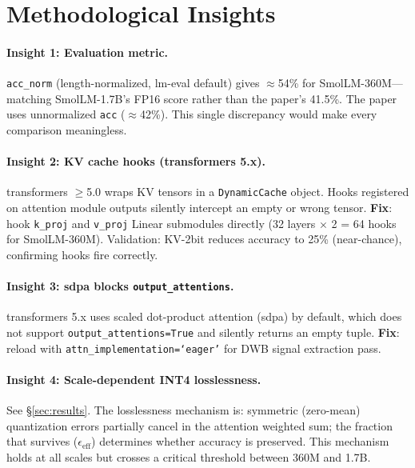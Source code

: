 \documentclass[10pt,twocolumn]{article}
\begin{document}
\section{Methodological Insights}
\label{sec:insights}

\paragraph{Insight 1: Evaluation metric.}
\texttt{acc\_norm} (length-normalized, lm-eval default) gives $\approx$54\%
for SmolLM-360M—matching SmolLM-1.7B's FP16 score rather than the
paper's 41.5\%.
The paper uses unnormalized \texttt{acc} ($\approx$42\%).
This single discrepancy would make every comparison meaningless.

\paragraph{Insight 2: KV cache hooks (transformers 5.x).}
transformers $\geq$5.0 wraps KV tensors in a \texttt{DynamicCache} object.
Hooks registered on attention module outputs silently intercept an empty
or wrong tensor.
\textbf{Fix}: hook \texttt{k\_proj} and \texttt{v\_proj} Linear submodules
directly (32 layers $\times$ 2 = 64 hooks for SmolLM-360M).
Validation: KV-2bit reduces accuracy to 25\% (near-chance), confirming
hooks fire correctly.

\paragraph{Insight 3: sdpa blocks \texttt{output\_attentions}.}
transformers 5.x uses scaled dot-product attention (sdpa) by default,
which does not support \texttt{output\_attentions=True} and silently
returns an empty tuple.
\textbf{Fix}: reload with \texttt{attn\_implementation=`eager'} for DWB
signal extraction pass.

\paragraph{Insight 4: Scale-dependent INT4 losslessness.}
See \S\ref{sec:results}.
The losslessness mechanism is: symmetric (zero-mean) quantization errors
partially cancel in the attention weighted sum; the fraction that
survives ($\epsilon_\text{eff}$) determines whether accuracy is
preserved.
This mechanism holds at all scales but crosses a critical threshold
between 360M and 1.7B.
\end{document}
